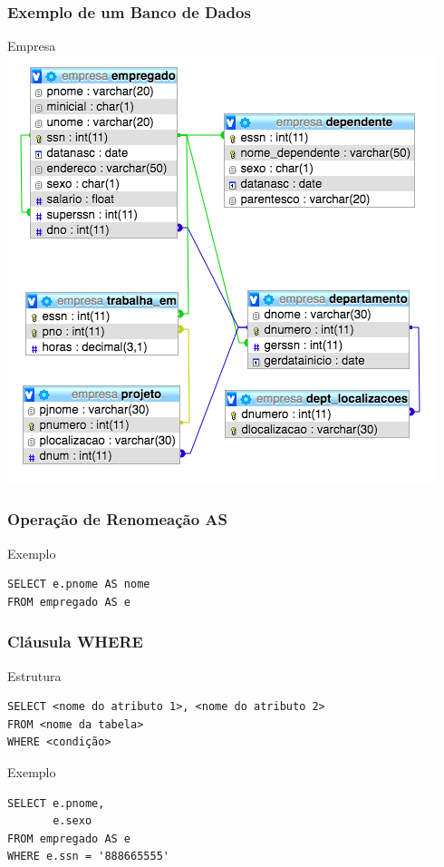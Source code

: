 \documentclass{beamer}
\begin{document}
\begin{frame}
\frametitle{Exemplo de um Banco de Dados}

\begin{exampleblock}{Empresa}
\centering
\includegraphics[scale=0.4]{img/empresa}
\end{exampleblock}
\end{frame}

\begin{frame}[fragile]
\frametitle{Operação de Renomeação AS}

\begin{exampleblock}{Exemplo}
	\begin{lstlisting}
SELECT e.pnome AS nome
FROM empregado AS e
	\end{lstlisting}
\end{exampleblock}
\end{frame}

\begin{frame}[fragile]
\frametitle{Cláusula WHERE}

\begin{block}{Estrutura}
	\begin{lstlisting}
SELECT <nome do atributo 1>, <nome do atributo 2>
FROM <nome da tabela>
WHERE <condição>
	\end{lstlisting}
\end{block}\vfill

\begin{exampleblock}{Exemplo}
	\begin{lstlisting}
SELECT e.pnome, 
       e.sexo
FROM empregado AS e
WHERE e.ssn = '888665555'
	\end{lstlisting}
\end{exampleblock}
\end{frame}
\end{document}
